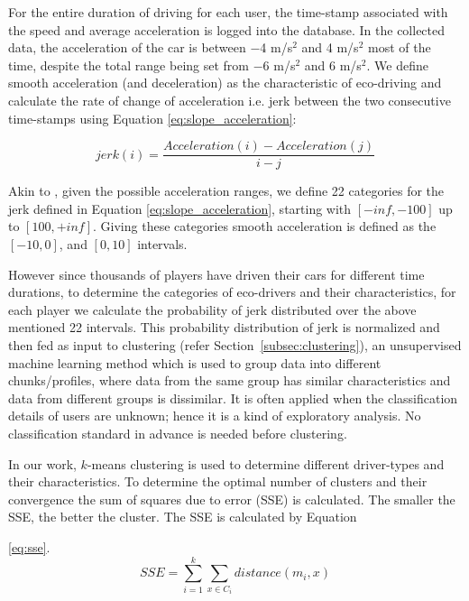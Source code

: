 \documentclass[preprint,authoryear,12pt]{elsarticle}
\begin{document}
For the entire duration of driving for each user, the time-stamp associated with the speed and average acceleration is logged into the database. In the collected data, the acceleration of the car is between $-$4 m/s$^2$ and 4 m/s$^2$ most of the time, despite the total range being set from $-$6 m/s$^2$ and 6 m/s$^2$.  We define smooth acceleration (and deceleration) as the characteristic of eco-driving and calculate the rate of change of acceleration i.e. jerk between the two consecutive time-stamps using Equation \ref{eq:slope_acceleration}:

\begin{equation}\label{eq:slope_acceleration}
jerk(i) = \frac{Acceleration(i) - Acceleration(j)}{i-j}
\end{equation}


Akin to \cite{prendingeroliveira2014}, given the possible acceleration ranges, we define 22 categories for the jerk defined in Equation \ref{eq:slope_acceleration}, 
starting with $[-inf , -100]$ up to $[100, +inf]$. Giving these categories smooth acceleration is defined as the $[-10, 0]$, and $[0, 10]$ intervals. 

However since thousands of players have driven their cars for different time durations, to determine the categories of eco-drivers and their characteristics, for each player we calculate the probability of jerk distributed over the above mentioned 22 intervals. This probability distribution of jerk is normalized and then fed as input to clustering (refer Section~\ref{subsec:clustering}), an unsupervised machine learning method which is used to group data into different chunks/profiles, where data from the same group has similar characteristics and data from different groups is dissimilar. It is often applied when the classification details of users are unknown; hence it is a kind of exploratory analysis. No classification standard in advance is needed before clustering. 


In our work, $k$-means clustering is used \citep{KMEAN.1979} to determine different driver-types and their characteristics. To determine the optimal number of clusters and their convergence the sum of squares due to error (SSE) is calculated.  The smaller the SSE, the better the cluster. The SSE is calculated by Equation

\ref{eq:sse}.
\begin{equation}\label{eq:sse}
SSE = \sum\limits_{i=1}^{k} \sum\limits_{x \in C_{i}}distance(m_{i},x)
\end{equation}
\end{document}
